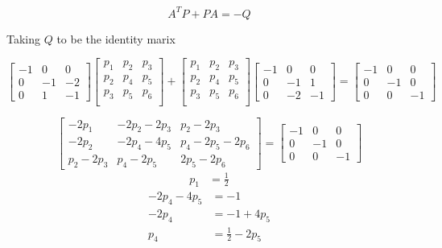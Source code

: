 \documentclass{article}
\begin{document}
\begin{enumerate}[label=\alph*)]
\begin{enumerate}[label=\roman*)]
        \[A^T P + PA = -Q\]

        Taking $Q$ to be the identity marix

        \[
        \begin{bmatrix}
            -1 & 0 & 0 \\
            0 & -1 & -2 \\
            0 & 1 & -1
        \end{bmatrix} 
        \begin{bmatrix}
            p_1 & p_2 & p_3 \\
            p_2 & p_4 & p_5 \\
            p_3 & p_5 & p_6 \\
        \end{bmatrix}
        +
        \begin{bmatrix}
            p_1 & p_2 & p_3 \\
            p_2 & p_4 & p_5 \\
            p_3 & p_5 & p_6 \\
        \end{bmatrix}
        \begin{bmatrix}
            -1 & 0 & 0 \\
            0 & -1 & 1 \\
            0 & -2 & -1
        \end{bmatrix} 
        =
        \begin{bmatrix}
            -1 & 0 & 0 \\
            0 & -1 & 0 \\
            0 & 0 & -1
        \end{bmatrix} 
        \]

        \[
        \begin{bmatrix}
            -2p_1 & -2p_2 - 2p_3 & p_2 - 2p_3 \\
            -2p_2 & -2p_4 - 4p_5 & p_4 - 2p_5 - 2p_6 \\
            p_2 - 2p_3 & p_4 - 2p_5 & 2p_5 - 2p_6
        \end{bmatrix} 
        =
        \begin{bmatrix}
            -1 & 0 & 0 \\
            0 & -1 & 0 \\
            0 & 0 & -1
        \end{bmatrix} 
        \]
        \begin{align*}
            p_1 &= \boxed{\frac{1}{2}}
        \end{align*}
        \begin{align*}
            -2p_4 - 4p_5 &= -1 \\
            -2p_4 &= -1 + 4p_5 \\
            p_4 &= \frac{1}{2} - 2p_5
        \end{align*}


\end{enumerate}
\end{enumerate}
\end{document}
